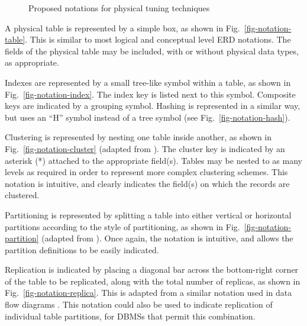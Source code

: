 \documentclass{llncs}
\begin{document}
\begin{figure}
	\hfill
	\hfill
	\caption{Proposed notations for physical tuning techniques}
	\label{fig-notation}
\end{figure}

A physical table is represented by a simple box, as shown in
Fig.~\ref{fig-notation-table}. This is similar to most logical and
conceptual level ERD notations. The fields of the physical table may be
included, with or without physical data types, as appropriate.

Indexes are represented by a small tree-like symbol within a table, as
shown in Fig.~\ref{fig-notation-index}. The index key is listed next to
this symbol. Composite keys are indicated by a grouping symbol. Hashing
is represented in a similar way, but uses an ``H'' symbol instead of a
tree symbol (see Fig.~\ref{fig-notation-hash}).

Clustering is represented by nesting one table inside another, as shown
in Fig.~\ref{fig-notation-cluster} (adapted from
\cite{BeDa-P-1992-PDD}). The cluster key is indicated by an asterisk (*)
attached to the appropriate field(s). Tables may be nested to as many
levels as required in order to represent more complex clustering
schemes. This notation is intuitive, and clearly indicates the field(s)
on which the records are clustered.

Partitioning is represented by splitting a table into either vertical or
horizontal partitions according to the style of partitioning, as shown
in Fig.~\ref{fig-notation-partition} (adapted from
\cite{Silb-A-2002-4E}). Once again, the notation is intuitive, and
allows the partition definitions to be easily indicated.

Replication is indicated by placing a diagonal bar across the
bottom-right corner of the table to be replicated, along with the total
number of replicas, as shown in Fig.~\ref{fig-notation-replica}. This is
adapted from a similar notation used in data flow diagrams
\cite{Gane-C-1979}. This notation could also be used to indicate
replication of individual table partitions, for DBMSs that permit this
combination.
\end{document}
